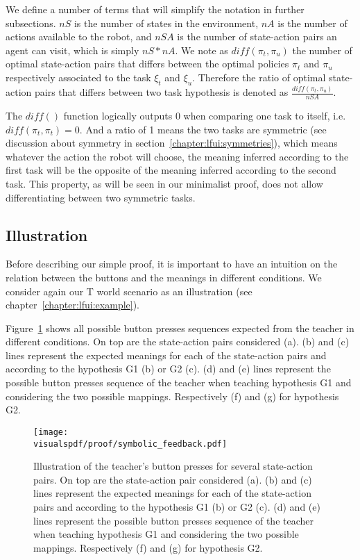 We define a number of terms that will simplify the notation in further subsections. $nS$ is the number of states in the environment, $nA$ is the number of actions available to the robot, and $nSA$ is the number of state-action pairs an agent can visit, which is simply $nS * nA$. We note as $diff(\pi_t, \pi_u)$ the number of optimal state-action pairs that differs between the optimal policies $\pi_t$ and $\pi_u$ respectively associated to the task $\xi_t$ and $\xi_u$. Therefore the ratio of optimal state-action pairs that differs between two task hypothesis is denoted as $\frac{diff(\pi_t, \pi_u)}{nSA}$. 

The $diff()$ function logically outputs $0$ when comparing one task to itself, i.e. $diff(\pi_t, \pi_t) = 0$. And a ratio of 1 means the two tasks are symmetric (see discussion about symmetry in section~\ref{chapter:lfui:symmetries}), which means whatever the action the robot will choose, the meaning inferred according to the first task will be the opposite of the meaning inferred according to the second task. This property, as will be seen in our minimalist proof, does not allow differentiating between two symmetric tasks.

\subsection{Illustration}

Before describing our simple proof, it is important to have an intuition on the relation between the buttons and the meanings in different conditions. We consider again our T world scenario as an illustration (see chapter~\ref{chapter:lfui:example}).

Figure~\ref{fig:proofsymbolic} shows all possible button presses sequences expected from the teacher in different conditions. On top are the state-action pairs considered (a). (b) and (c) lines represent the expected meanings for each of the state-action pairs and according to the hypothesis G1 (b) or G2 (c). (d) and (e) lines represent the possible button presses sequence of the teacher when teaching hypothesis G1 and considering the two possible mappings. Respectively (f) and (g) for hypothesis G2.

\begin{figure}[!htbp]
\centering
\texttt{[image: \\visualspdf/proof/symbolic\_feedback.pdf]}
\caption{Illustration of the teacher's button presses for several state-action pairs. On top are the state-action pair considered (a). (b) and (c) lines represent the expected meanings for each of the state-action pairs and according to the hypothesis G1 (b) or G2 (c). (d) and (e) lines represent the possible button presses sequence of the teacher when teaching hypothesis G1 and considering the two possible mappings. Respectively (f) and (g) for hypothesis G2.}
\label{fig:proofsymbolic}
\end{figure} 

